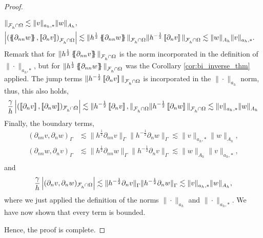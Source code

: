 \begin{proof}
\begin{enumerate}[label=\arabic*)]
\[\begin{split}
    \|_{\mathcal{F}_{h}^{} \cap \Omega  }^{  } \lesssim \| v  \|_{ a_{h},*  }^{  }\|  w \|_{A_{h}  }^{  }, \\
            \abs{\left( \mean{  \partial _{n n} w }, \jump{ \partial _{n }v} \right)_{\mathcal{F}_{h}^{} \cap \Omega}  } &\lesssim \| h^{\frac{1}{2}}\mean{ \partial _{nn}w }   \|_{ \mathcal{F}_{h}^{} \cap \Omega  }^{  } \| h^{-\frac{1}{2}}\jump{ \partial _{n }v}
    \|_{\mathcal{F}_{h}^{} \cap \Omega  }^{  } \lesssim \| w  \|_{A_{h}  }^{  }\|  v \|_{ a_{h},*  }^{  }.
        \end{split}
    \]
    Remark that for $\| h^{\frac{1}{2}} \left\{\!\!\left\{ \partial _{nn} v \right\}\!\!\right\}   \|_{\mathcal{F}^{} _{h} \cap \Omega   }^{  } $ is the norm incorporated in the definition of $\| \cdot  \|_{ a_{h},* }^{  } $, but for $\| h^{\frac{1}{2}} \left\{\!\!\left\{ \partial _{nn} w \right\}\!\!\right\}   \|_{
    \mathcal{F}_{h}^{}\cap \Omega   }^{  } $ was the Corollary \ref{cor:bi_inverse_thm} applied. The jump terms $\|h^{-\frac{1}{2}} \left[\!\left[ \partial _{n} v   \right]\!\right]   \|_{\mathcal{F}^{}_{h}\cap \Omega    }^{  } $
is incorporated in the $\| \cdot  \|_{ a_{h} }^{  } $ norm, thus, this also holds, \[
\frac{\gamma }{h}\abs{  ( \jump{ \partial _{n} v }  , \jump{\partial _{n} w }  )_{\mathcal{F}^{} _{h} \cap \Omega } } \lesssim \| h^{-\frac{1}{2}} \jump{\partial _{n} v },      \|_{ \mathcal{F}^{} _{h}\cap \Omega   }^{  }     \|
h^{-\frac{1}{2}} \jump{\partial _{n} w } \|_{\mathcal{F}^{} _{h}\cap \Omega
}^{  } \lesssim \| v \|_{ a_{h},* }^{  } \| w \|_{ A_{h} }^{  }
\]
Finally, the boundary terms, \[
    \begin{split}
( \partial _{nn} v, \partial _{n} w)_\Gamma & \lesssim \| h^{\frac{1}{2}} \partial _{nn} v \|_{ \Gamma   }^{  }  \|h^{-\frac{1}{2}} \partial _{n} w \|_{ \Gamma   }^{  } \lesssim \| v \|_{ a_{h},* }^{  } \| w \|_{ A_{h} }^{  }   , \\
( \partial _{nn} w, \partial _{n} v)_\Gamma & \lesssim \| h^{\frac{1}{2}} \partial _{nn} w \|_{ \Gamma   }^{  }  \|h^{-\frac{1}{2}} \partial _{n} v \|_{ \Gamma   }^{  } \lesssim \| w \|_{ A_{h} }^{  } \| v \|_{ a_{h},* }^{  }   , \\
    \end{split}
\]
and \[
\frac{\gamma }{h} \left\lvert  (  \partial _{n} v, \partial _{n}w)_{\mathcal{F}^{} _{h} \cap \Omega }    \right\rvert\lesssim \| h^{- \frac{1}{2}} \partial _{n} v \|_{ \Gamma   }^{  }  \| h^{-\frac{1}{2}} \partial _{n} w \|_{ \Gamma   }^{  } \lesssim \| v \|_{ a_{h},*
}^{  } \| w \|_{ A_{h}  }^{  },
\]
where we just applied the definition of the norms $\| \cdot  \|_{a_{h}  }^{  } $ and $\| \cdot  \|_{a_{h},*  }^{  } $. We have now shown that every term is bounded.

    \end{enumerate}
    Hence, the proof is complete.
\end{proof}





